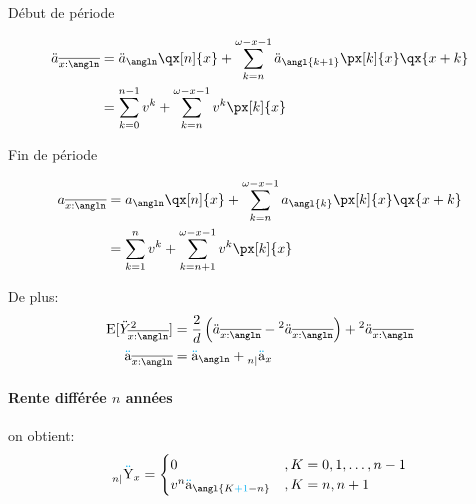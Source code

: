 \documentclass[10pt, french]{article}
\newcommand\cumlaut[2][black]{\stackon[.33ex]{#2}{\textcolor{#1}{\kern-.04ex.\kern-.2ex.}}}
\begin{document}
\begin{multicols*}{3}
\setlength{\mathindent}{-1cm}
\begin{minipage}[t]{0.5\columnwidth}
\begin{center}
Début de période
\end{center}
\begin{align*}
	\ddot{a}_{\overline{x:\angln}}	
	&=	\ddot{a}_{\angln} \qx[n]{x} + \sum_{k = n}^{\omega - x - 1} \ddot{a}_{\angl{k + 1}}  \px[k]{x}  \qx{x + k}	\\
	&=	\sum_{k = 0}^{n - 1} v^{k} + \sum_{k = n}^{\omega - x - 1} v^{k} \px[k]{x}	\\
\end{align*}
\end{minipage}
\begin{minipage}[t]{0.5\columnwidth}
\begin{center}
Fin de période
\end{center}
\begin{align*}
	a_{\overline{x:\angln}}	
	&=	a_{\angln} \qx[n]{x} + \sum_{k = n}^{\omega - x - 1} a_{\angl{k}}  \px[k]{x}  \qx{x + k}	\\
	&=	\sum_{k = 1}^{n} v^{k} + \sum_{k = n + 1}^{\omega - x - 1} v^{k} \px[k]{x}	\\
\end{align*}
\end{minipage}
\setlength{\mathindent}{1cm}

De plus:
\begin{align*}
	\text{E}[\ddot{Y}_{\overline{x:\angln}}^{2}]	
	&=	\frac{2}{d} \left(\ddot{a}_{\overline{x:\angln}} - \prescript{2}{}{\ddot{a}_{\overline{x:\angln}}}\right) + \prescript{2}{}{\ddot{a}_{\overline{x:\angln}}}	\\
	\cumlaut[cyan]{a}_{\overline{x:\angln}}			
	&=	\cumlaut[cyan]{a}_{\angln} + \prescript{}{n|}{\cumlaut[cyan]{a}_{x}}
\end{align*}


\paragraph{Rente différée $n$ années}

on obtient:
\begin{align*}
	\prescript{}{n|}{\cumlaut[cyan]{Y}}_{x} 
	&= 	\begin{cases}
			0	& , K = 0, 1, \dots, n - 1 \\
			v^{n} \cumlaut[cyan]{a}_{\angl{K \textcolor{cyan}{+ 1} - n}}			& , K = n, n + 1 \\
		\end{cases} 	\\
\end{align*}


\end{multicols*}
\end{document}
